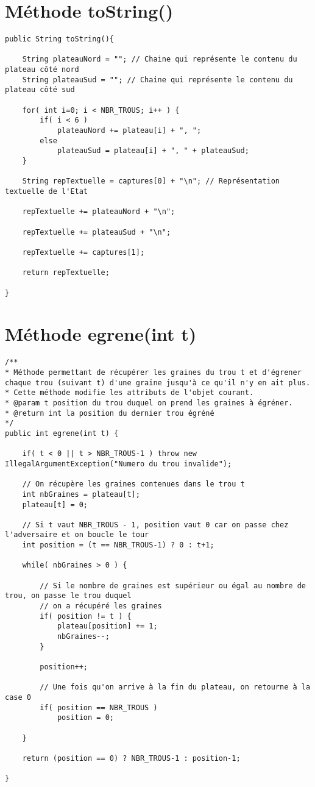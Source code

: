 \documentclass[11pt,a4paper]{report}
\begin{document}
\section{Méthode toString()}
\begin{lstlisting}
public String toString(){

    String plateauNord = ""; // Chaine qui représente le contenu du plateau côté nord
    String plateauSud = ""; // Chaine qui représente le contenu du plateau côté sud

    for( int i=0; i < NBR_TROUS; i++ ) {
        if( i < 6 )
            plateauNord += plateau[i] + ", ";
        else
            plateauSud = plateau[i] + ", " + plateauSud;
    }

    String repTextuelle = captures[0] + "\n"; // Représentation textuelle de l'Etat
    
    repTextuelle += plateauNord + "\n";

    repTextuelle += plateauSud + "\n";

    repTextuelle += captures[1];

    return repTextuelle;

}
\end{lstlisting}

\section{Méthode egrene(int t)}
\begin{lstlisting}
/**
* Méthode permettant de récupérer les graines du trou t et d'égrener chaque trou (suivant t) d'une graine jusqu'à ce qu'il n'y en ait plus.
* Cette méthode modifie les attributs de l'objet courant.
* @param t position du trou duquel on prend les graines à égréner.
* @return int la position du dernier trou égréné
*/
public int egrene(int t) {

    if( t < 0 || t > NBR_TROUS-1 ) throw new IllegalArgumentException("Numero du trou invalide");

    // On récupère les graines contenues dans le trou t
    int nbGraines = plateau[t];
    plateau[t] = 0;

    // Si t vaut NBR_TROUS - 1, position vaut 0 car on passe chez l'adversaire et on boucle le tour
    int position = (t == NBR_TROUS-1) ? 0 : t+1;

    while( nbGraines > 0 ) {

        // Si le nombre de graines est supérieur ou égal au nombre de trou, on passe le trou duquel
        // on a récupéré les graines
        if( position != t ) {
            plateau[position] += 1;
            nbGraines--;
        }

        position++;

        // Une fois qu'on arrive à la fin du plateau, on retourne à la case 0
        if( position == NBR_TROUS )
            position = 0;

    }

    return (position == 0) ? NBR_TROUS-1 : position-1;

}
\end{lstlisting}
\end{document}
